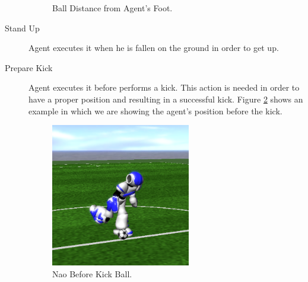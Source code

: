\begin{description}
\begin{figure}[!h]
  \caption{Ball Distance from Agent's Foot.}
  \label{fig:2dkinematics}
\end{figure}
 \item[Stand Up] Agent executes it when he is fallen on the ground in order to get up.
 \item[Prepare Kick] Agent executes it before performs a kick. This action is needed in order to have a proper position and resulting in a successful kick. Figure \ref{fig:NaoKick} shows an example in which we are showing the agent's position before the kick.
  \begin{figure}[!h]
\centering
  \includegraphics[width=0.6\textwidth]{Chapter3/figures/NaoKick.png}
  \caption{Nao Before Kick Ball.}
  \label{fig:NaoKick}
\end{figure}
\end{description}

